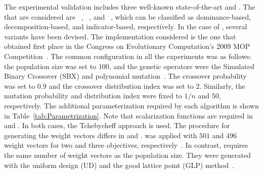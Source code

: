 The experimental validation includes three well-known state-of-the-art \MOEAS{} and \VSDMOEA{}.
%
The \MOEAS{} that are considered are \NSGAII{}~\cite{Joel:jMetal}, \MOEAD{}~\cite{MOEADCode}, and \RMOEA{}~\cite{R2EMOACode}, 
which can be classified as dominance-based, decomposition-based, and indicator-based, respectively.
%
In the case of \MOEAD{}, several variants have been devised.
%
The \MOEAD{} implementation considered is the one that obtained first place in the Congress on Evolutionary Computation's 
2009 MOP Competition~\cite{zhang2009performance}.
%
The common configuration in all the experiments was as follows: the population size was set to $100$, and the genetic operators were the Simulated Binary Crossover (SBX) and polynomial 
mutation~\cite{Joel:SBX1994, Joel:Mutation}.
%
The crossover probability was set to $0.9$ and the crossover distribution index was set to $2$.
%
Similarly, the mutation probability and distribution index were fixed to $1/n$ and $50$, respectively.
%
The additional parameterization required by each algorithm is shown in Table~\ref{tab:Parametrization}.
%
Note that scalarization functions are required in \MOEAD{} and \RMOEA{}.
%
In both cases, the Tchebycheff approach is used.
%
The procedure for generating the weight vectors differs in \MOEAD{} and \RMOEA{}.
%
\RMOEA{} was applied with $501$ and $496$ weight vectors for two and three objectives, respectively~\cite{trautmann2013r2}.
%
In contrast, \MOEAD{} requires the same number of weight vectors as the population size.
%
They were generated with the uniform design (UD) and the good lattice point (GLP) method~\cite{Joel:MOEAD_Uniform_Design, Joel:Kuhn_Munkres}.

